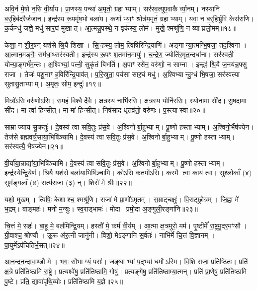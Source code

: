 अवि॒र्न मे॒षो न॒सि वी॒र्या॑य।
प्रा॒णस्य॒ पन्था॑ अ॒मृतो॒ ग्रहाभ्याम्।
सर॑स्व॒त्युप॒वाकैर्व्या॒नम्।
नस्या॑नि ब॒र्॒हिर्बद॑रैर्जजान।
इन्द्र॑स्य रू॒पमृ॑ष॒भो बला॑य।
कर्णाभ्या॒ꣳ श्रोत्र॑म॒मृतं॒ ग्रहाभ्याम्।
यवा॒ न ब॒र्॒हिर्भ्रु॒वि केस॑राणि।
क॒र्कन्धु॑ जज्ञे॒ मधु॑ सार॒घं मुखात्।
आ॒त्मन्नु॒पस्थे॒ न वृक॑स्य॒ लोम॑।
मुखे॒ श्मश्रू॑णि॒ न व्याघ्रलो॒मम्॥१८॥

केशा॒ न शी॒र्॒षन्‌ यश॑से श्रि॒यै शिखा।
सि॒ꣳ॒हस्य॒ लोम॒ त्विषि॑रिन्द्रि॒याणि॑।
अङ्गान्या॒त्मन्भि॒षजा॒ तद॒श्विना।
आ॒त्मान॒मङ्गैः॒ सम॑धा॒थ्सर॑स्वती।
इन्द्र॑स्य रू॒पꣳ श॒तमा॑न॒मायुः॑।
च॒न्द्रेण॒ ज्योति॑र॒मृत॒न्दधा॑ना।
सर॑स्वती॒ योन्या॒ङ्गर्भ॑म॒न्तः।
अ॒श्विभ्यां॒ पत्नी॒ सुकृ॑तं बिभर्ति।
अ॒पाꣳ रसे॑न॒ वरु॑णो॒ न साम्ना।
इन्द्रꣴ॑ श्रि॒यै ज॒नय॑न्न॒फ्सु राजा।
तेजः॑ पशू॒नाꣳ ह॒विरि॑न्द्रि॒याव॑त्।
प॒रि॒स्रुता॒ पय॑सा सार॒घं मधु॑।
अ॒श्विभ्यान्दु॒ग्धं भि॒षजा॒ सर॑स्वत्या सुतासु॒ताभ्याम्।
अ॒मृतः॒ सोम॒ इन्दुः॑॥१९॥\anuvakamend[अन्त॑र आ॒राद॒न्तर्व॑साते व्याघ्रलो॒मꣳ राजा॑ च॒त्वारि॑ च]

मि॒त्रो॑ऽसि॒ वरु॑णोऽसि।
सम॒हं विश्वैर्दे॒वैः।
क्ष॒त्रस्य॒ नाभि॑रसि।
क्ष॒त्रस्य॒ योनि॑रसि।
स्यो॒नामा सी॑द।
सु॒षदा॒मा सी॑द।
मा त्वा॑ हिꣳसीत्।
मा मा॑ हिꣳसीत्।
निष॑साद धृ॒तव्र॑तो॒ वरु॑णः।
प॒स्त्यास्वा॥२०॥

साम्राज्याय सु॒क्रतुः॑।
दे॒वस्य॑ त्वा सवि॒तुः प्र॑स॒वे।
अ॒श्विनोर्बा॒हुभ्याम्।
पू॒ष्णो हस्ताभ्याम्।
अ॒श्विनो॒र्भैष॑ज्येन।
तेज॑से ब्रह्मवर्च॒साया॒भिषि॑ञ्चामि।
दे॒वस्य॑ त्वा सवि॒तुः प्र॑स॒वे।
अ॒श्विनोर्बा॒हुभ्याम्।
पू॒ष्णो हस्ताभ्याम्।
सर॑स्वत्यै॒ भैष॑ज्येन॥२१॥

वी॒र्या॑या॒न्नाद्या॑या॒भिषि॑ञ्चामि।
दे॒वस्य॑ त्वा सवि॒तुः प्र॑स॒वे।
अ॒श्विनोर्बा॒हुभ्याम्।
पू॒ष्णो हस्ताभ्याम्।
इन्द्र॑स्येन्द्रि॒येण॑।
श्रि॒यै यश॑से॒ बला॑या॒भिषि॑ञ्चामि।
को॑ऽसि कत॒मो॑ऽसि।
कस्मै त्वा॒ काय॑ त्वा।
सुश्लो॒काँ (४) सुम॑ङ्ग॒लाँ (४) सत्य॑रा॒जा (३) न्।
शिरो॑ मे॒ श्रीः॥२२॥

यशो॒ मुखम्।
त्विषिः॒ केशाश्च॒ श्मश्रू॑णि।
राजा॑ मे प्रा॒णो॑\-ऽमृतम्।
स॒म्राट्चक्षुः॑।
वि॒राट्छ्रोत्रम्।
जि॒ह्वा मे॑ भ॒द्रम्।
वाङ्महः॑।
मनो॑ म॒न्युः।
स्व॒राड्भामः॑।
मोदा प्रमो॒दा अ॒ङ्गुली॒रङ्गा॑नि॥२३॥

चि॒त्तं मे॒ सहः॑।
बा॒हू मे॒ बल॑मिन्द्रि॒यम्।
हस्तौ॑ मे॒ कर्म॑ वी॒र्यम्।
आ॒त्मा क्ष॒त्रमुरो॒ मम॑।
पृ॒ष्टीर्मे॑ रा॒ष्ट्रमु॒दर॒मꣳसौ।
ग्री॒वाश्च॒ श्रोण्यौ।
ऊ॒रू अ॑र॒त्नी जानु॑नी।
विशो॒ मेऽङ्गा॑नि स॒र्वतः॑।
नाभि॑र्मे चि॒त्तं वि॒ज्ञानम्।
पा॒युर्मे\-ऽप॑चितिर्भ॒सत्॥२४॥

आ॒न॒न्द॒न॒न्दावा॒ण्डौ मे।
भगः॒ सौभाग्यं॒ पसः॑।
जङ्घाभ्यां प॒द्भ्यां धर्मो\-ऽस्मि।
वि॒शि राजा॒ प्रति॑ष्ठितः।
प्रति॑ क्ष॒त्रे प्रति॑तिष्ठामि रा॒ष्ट्रे।
प्रत्यश्वे॑षु॒ प्रति॑तिष्ठामि॒ गोषु॑।
प्रत्यङ्गे॑षु॒ प्रति॑तिष्ठाम्या॒त्मन्।
प्रति॑ प्रा॒णेषु॒ प्रति॑तिष्ठामि पु॒ष्टे।
प्रति॒ द्यावा॑पृथि॒व्योः।
प्रति॑तिष्ठामि य॒ज्ञे॥२५॥


